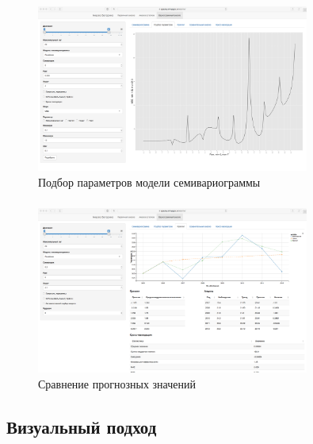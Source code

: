 \documentclass[notheorems]{beamer}
\theoremstyle{definition}
\theoremstyle{example}
\theoremstyle{plain}
\begin{document}
\begin{frame}
  \frametitle{\large\secname}
  \framesubtitle{\subsecname}
    \begin{figure}[h]
    \includegraphics[width=0.8\textwidth]{../../figures/static/5_fit.png}
    \caption{Подбор параметров модели семивариограммы}
  \end{figure}
\end{frame}

\begin{frame}
  \frametitle{\large\secname}
  \framesubtitle{\subsecname}
    \begin{figure}[h]
    \includegraphics[width=0.8\textwidth]{../../figures/static/6_krige.png}
    \caption{Сравнение прогнозных значений}
  \end{figure}
\end{frame}

\subsection{Визуальный подход}%
\end{document}
